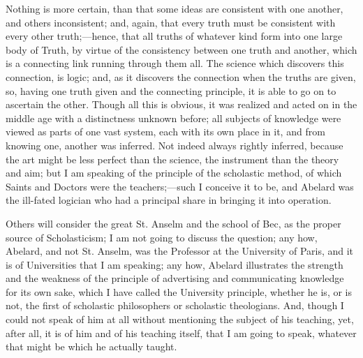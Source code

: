 Nothing is more certain, than
that some ideas are consistent with one another, and others
inconsistent; and, again, that every truth must be consistent with
every other truth;—hence, that all truths of whatever kind form into
one large body of Truth, by virtue of the consistency between one
truth and another, which is a connecting link running through them
all. The science which discovers this connection, is logic; and, as it
discovers the connection when the truths are given, so, having one
truth given and the connecting principle, it is able to go on to
ascertain the other. Though all this is obvious, it was realized and
acted on in the middle age with a distinctness unknown before; all
subjects of knowledge were viewed as parts of one vast system, each
with its own place in it, and from knowing one, another was inferred.
Not indeed always rightly inferred, because the art might be less
perfect than the science, the instrument than the theory and aim; but
I am speaking of the principle of the scholastic method, of which
Saints and Doctors were the teachers;—such I conceive it to
be, and Abelard was the ill-fated logician who had a principal share
in bringing it into operation.

Others will consider the great
St. Anselm and the school of Bec, as the proper source of
Scholasticism; I am not going to discuss the question; any how,
Abelard, and not St. Anselm, was the Professor at the University of
Paris, and it is of Universities that I am speaking; any how, Abelard
illustrates the strength and the weakness of the principle of
advertising and communicating knowledge for its own sake, which I have
called the University principle, whether he is, or is not, the first
of scholastic philosophers or scholastic theologians. And, though I
could not speak of him at all without mentioning the subject of his
teaching, yet, after all, it is of him and of his teaching itself,
that I am going to speak, whatever that might be which he actually
taught.

